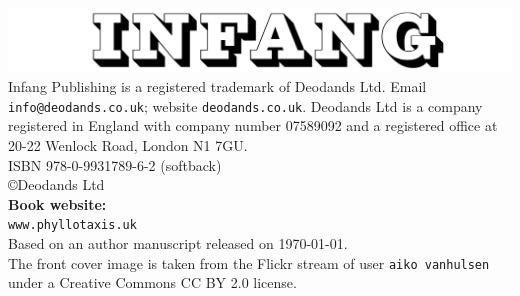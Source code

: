 
\thispagestyle{titlingpage}
{
\mbox{}\vspace{\fill}

		\includegraphics[width=.6\jfigwidth]{./Figures/infang.jpg}
		\\[10ex]
		Infang Publishing is a registered trademark of Deodands Ltd.
		Email \texttt{info@deodands.co.uk}; website \texttt{deodands.co.uk}.
		Deodands Ltd is a company registered in England with company number 07589092 and 
		a registered office at
		20-22 Wenlock Road, London N1 7GU.
		\\[10ex] %
		{\textsc{ISBN}} 978-0-9931789-6-2 (softback)
		\\[5ex]
		\copyright Deodands Ltd \jPublicationYear
		\\[10ex]
		\textbf{Book website:}
		\\
		\texttt{www.phyllotaxis.uk}
		\\[10ex]
		{Based on an author manuscript  \jdraftnumber{} released on \today.}
		\\[10ex]
The front cover image is taken from the Flickr stream of user \texttt{aiko vanhulsen} under a Creative Commons CC BY 2.0 license.\\
}
\newpage


